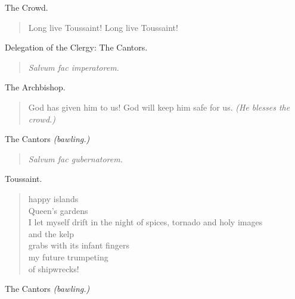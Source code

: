 \documentclass[letterpaper,article,12pt,oneside,notitlepage]{memoir}
\begin{document}
\begin{center}The Crowd.\end{center}

\begin{verse}
Long live Toussaint! Long live Toussaint! \\
\end{verse}

\clearpage

\begin{center}Delegation of the Clergy: The Cantors.\end{center}

\begin{verse}
\textit{Salvum fac imperatorem.} \\
\end{verse}

\begin{center}The Archbishop.\end{center}

\begin{verse}
God has given him to us! God will keep him safe for us. \textit{(He blesses the crowd.)} \\
\end{verse}

\begin{center}The Cantors  \textit{(bawling.)}\end{center}

\begin{verse}
\textit{Salvum fac gubernatorem.} \\
\end{verse}

\begin{center}Toussaint.\end{center}

\begin{verse}
happy islands \\
Queen's gardens \\
I let myself drift in the night of spices, tornado and holy images \\
and the kelp \\
grabs with its infant fingers \\
my future trumpeting \\
of shipwrecks! \\
\end{verse}

\begin{center}The Cantors  \textit{(bawling.)}\end{center}
\end{document}
